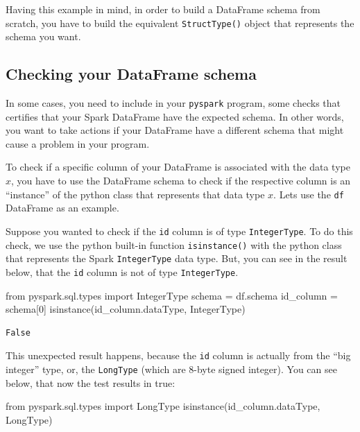 \documentclass[
  11pt,
  letterpaper,
  DIV=11,
  numbers=noendperiod]{scrreprt}
\newenvironment{Shaded}{\begin{snugshade}}{\end{snugshade}}
\newcommand{\BuiltInTok}[1]{\textcolor[rgb]{0.00,0.23,0.31}{#1}}
\newcommand{\DecValTok}[1]{\textcolor[rgb]{0.68,0.00,0.00}{#1}}
\newcommand{\ImportTok}[1]{\textcolor[rgb]{0.00,0.46,0.62}{#1}}
\newcommand{\NormalTok}[1]{\textcolor[rgb]{0.00,0.23,0.31}{#1}}
\newcommand{\OperatorTok}[1]{\textcolor[rgb]{0.37,0.37,0.37}{#1}}
\begin{document}
Having this example in mind, in order to build a DataFrame schema from
scratch, you have to build the equivalent \texttt{StructType()} object
that represents the schema you want.

\hypertarget{checking-your-dataframe-schema}{%
\subsection{Checking your DataFrame
schema}\label{checking-your-dataframe-schema}}

In some cases, you need to include in your \texttt{pyspark} program,
some checks that certifies that your Spark DataFrame have the expected
schema. In other words, you want to take actions if your DataFrame have
a different schema that might cause a problem in your program.

To check if a specific column of your DataFrame is associated with the
data type \(x\), you have to use the DataFrame schema to check if the
respective column is an ``instance'' of the python class that represents
that data type \(x\). Lets use the \texttt{df} DataFrame as an example.

Suppose you wanted to check if the \texttt{id} column is of type
\texttt{IntegerType}. To do this check, we use the python built-in
function \texttt{isinstance()} with the python class that represents the
Spark \texttt{IntegerType} data type. But, you can see in the result
below, that the \texttt{id} column is not of type \texttt{IntegerType}.

\begin{Shaded}
\begin{Highlighting}[]
\ImportTok{from}\NormalTok{ pyspark.sql.types }\ImportTok{import}\NormalTok{ IntegerType}
\NormalTok{schema }\OperatorTok{=}\NormalTok{ df.schema}
\NormalTok{id\_column }\OperatorTok{=}\NormalTok{ schema[}\DecValTok{0}\NormalTok{]}
\BuiltInTok{isinstance}\NormalTok{(id\_column.dataType, IntegerType)}
\end{Highlighting}
\end{Shaded}

\begin{verbatim}
False
\end{verbatim}

This unexpected result happens, because the \texttt{id} column is
actually from the ``big integer'' type, or, the \texttt{LongType} (which
are 8-byte signed integer). You can see below, that now the test results
in true:

\begin{Shaded}
\begin{Highlighting}[]
\ImportTok{from}\NormalTok{ pyspark.sql.types }\ImportTok{import}\NormalTok{ LongType}
\BuiltInTok{isinstance}\NormalTok{(id\_column.dataType, LongType)}
\end{Highlighting}
\end{Shaded}
\end{document}
